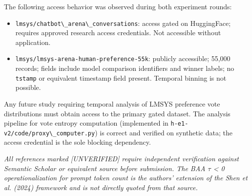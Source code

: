 The following access behavior was observed during both experiment rounds:

\begin{itemize}
\item \texttt{lmsys/chatbot\textbackslash \_arena\textbackslash \_conversations}: access gated on HuggingFace; requires approved research access credentials. Not accessible without application.
\item \texttt{lmsys/lmsys-arena-human-preference-55k}: publicly accessible; 55,000 records; fields include model comparison identifiers and winner labels; no \texttt{tstamp} or equivalent timestamp field present. Temporal binning is not possible.
\end{itemize}

Any future study requiring temporal analysis of LMSYS preference vote distributions must obtain access to the primary gated dataset. The analysis pipeline for vote entropy computation (implemented in \texttt{h-e1-v2/code/proxy\textbackslash \_computer.py}) is correct and verified on synthetic data; the access credential is the sole blocking dependency.


\textit{All references marked [UNVERIFIED] require independent verification against Semantic Scholar or equivalent source before submission. The BAA $\tau$ < 0 operationalization for prompt token count is the authors' extension of the Shen et al. (2024) framework and is not directly quoted from that source.}
